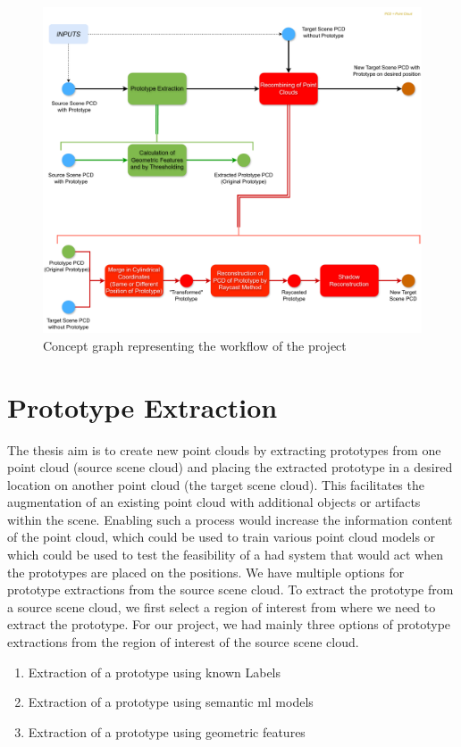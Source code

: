 \begin{figure}[htbp]
    \centering
    \includegraphics[width=1\linewidth]{97_graphics/concepts/graph_main.pdf}
    \caption{Concept graph representing the workflow of the project}
    \label{fig:concept-graph}
\end{figure}



\section{Prototype Extraction}
The thesis aim is to create new point clouds by extracting prototypes from one point cloud (source scene cloud) and placing the extracted prototype in a desired location on another point cloud (the target scene cloud). This facilitates the augmentation of an existing point cloud with additional objects or artifacts within the scene. Enabling such a process would increase the information content of the point cloud, which could be used to train various point cloud models or which could be used to test the feasibility of a \acrshort{had} system that would act when the prototypes are placed on the positions.
We have multiple options for prototype extractions from the source scene cloud. To extract the prototype from a source scene cloud, we first select a region of interest from where we need to extract the prototype. For our project, we had mainly three options of prototype extractions from the region of interest of the source scene cloud. 
\begin{enumerate}
    \item Extraction of a prototype using known Labels
    \item Extraction of a prototype using semantic \acrshort{ml} models
    \item Extraction of a prototype using geometric features
\end{enumerate}

